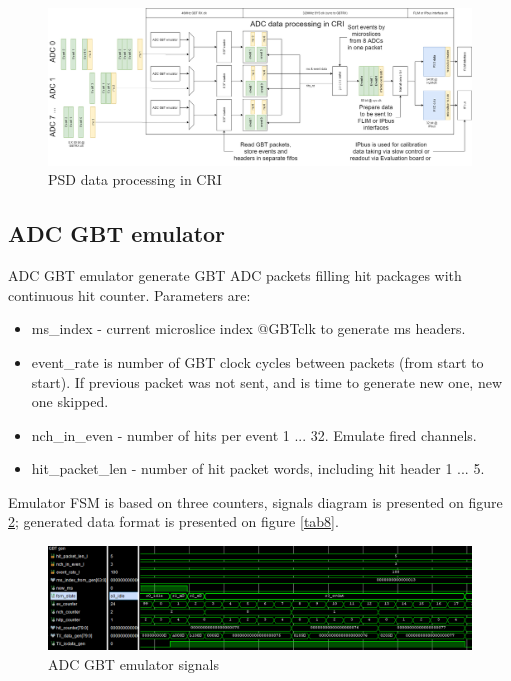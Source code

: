 \documentclass{article}
\begin{document}
\begin{figure}[H]
	\centering 
	\includegraphics[width=1.0\textwidth]{CRI_data_sort.png}
	\caption{\label{fig:cri-data-sort} PSD data processing in CRI}
\end{figure}
















\subsection{ADC GBT emulator}

ADC GBT emulator generate GBT ADC packets filling hit packages with continuous hit counter. Parameters are:

\begin{itemize}
\item ms\_index - current microslice index @GBTclk to generate ms headers.


\item  event\_rate is number of GBT clock cycles between packets (from start to start). If previous packet was not sent, and is time to generate new one, new one skipped.

\item nch\_in\_even - number of hits per event 1 ... 32. Emulate fired channels.

\item hit\_packet\_len - number of hit packet words, including hit header 1 ... 5.

\end{itemize}

Emulator FSM is based on three counters, signals diagram is presented on figure \ref{fig:9}; generated data format is presented on figure \ref{tab8}.

\begin{figure}[H]
	\centering 
	\includegraphics[width=1.0\textwidth]{ADC_GBT_emu_waves.png}
	\caption{\label{fig:9} ADC GBT emulator signals}
\end{figure}
\end{document}
